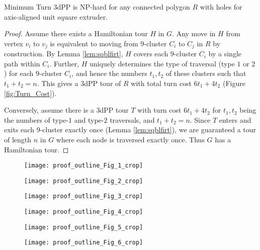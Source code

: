 \begin{lem}\label{lem:mtpnphard} 
  Minimum Turn 3dPP is NP-hard for any connected polygon $R$ with holes for axis-aligned unit square extruder. 	
\end{lem}
\begin{proof}
  Assume there exists a Hamiltonian tour $H$ in $G$.
  Any move in $H$ from vertex $v_i$ to $v_j$ is equivalent to moving from $9$-cluster $C_i$ to $C_j$ in $R$ by construction.
  By Lemma \ref{lem:sqblfirt}, $H$ covers each $9$-cluster $C_i$ by a single path within $C_i$.
  Further, $H$ uniquely determines the type of traversal (type $1$ or $2$) for each $9$-cluster $C_i$, and hence the numbers $t_1, t_2$ of these clusters such that $t_1 + t_2 = n$.
  This gives a 3dPP tour of $R$  with total turn cost $6t_1+4t_2$ (Figure \ref{fig:Turn_Cost}).

  Conversely, assume there is a 3dPP tour $T$ with turn cost $6t_1+4t_2$ for $t_1, t_2$ being the numbers of type-$1$ and type-$2$ traversals, and $t_1 + t_2 = n$.
  Since $T$ enters and exits each $9$-cluster exactly once (Lemma \ref{lem:sqblfirt}), we are guaranteed a tour of length $n$ in $G$ where each node is traversed exactly once.
  Thus $G$ has a Hamiltonian tour. 	
\end{proof}

\begin{figure*}[htp!] 
  \centering
  \begin{subfigure}[t]{2.5in}
    \centering
    \texttt{[image: proof\_outline\_Fig\_1\_crop]}
    \caption{\label{fig:proofoutlinea}}
  \end{subfigure}
  \begin{subfigure}[t]{2.5in}
    \centering
    \texttt{[image: proof\_outline\_Fig\_2\_crop]}
    \caption{\label{fig:proofoutlineb}}
  \end{subfigure}	
  \begin{subfigure}[t]{2.5in}
    \centering
    \texttt{[image: proof\_outline\_Fig\_3\_crop]}
    \caption{\label{fig:proofoutlinec}}
  \end{subfigure}
  \begin{subfigure}[t]{2.5in}
    \centering
    \texttt{[image: proof\_outline\_Fig\_4\_crop]}
    \caption{\label{fig:proofoutlined}}
  \end{subfigure}
  \begin{subfigure}[t]{2.5in}
    \centering
    \texttt{[image: proof\_outline\_Fig\_5\_crop]}
    \caption{\label{fig:proofoutlinee}}
  \end{subfigure}
  \begin{subfigure}[t]{2.5in}
    \centering
    \texttt{[image: proof\_outline\_Fig\_6\_crop]}
    \caption{\label{fig:Square_Block_First_Simply_Connected}}
  \end{subfigure}
  \caption{\label{fig:proofoutline}
    See text above Lemma \ref{lem:sqblfirt} for details on Figures (\ref{fig:proofoutlinea})--(\ref{fig:proofoutlinee}).
    Proof of Corollary \ref{cor:nphardsplpoly} is illustrated in Figure (\ref{fig:Square_Block_First_Simply_Connected}).
  }
\end{figure*}

